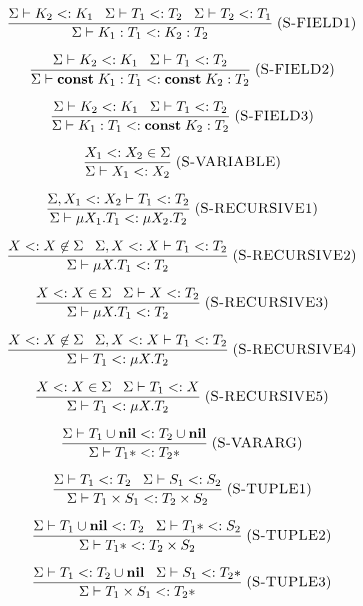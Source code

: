 \[
\frac{\Sigma \vdash K_{2} <: K_{1} \;\;\;
      \Sigma \vdash T_{1} <: T_{2} \;\;\;
      \Sigma \vdash T_{2} <: T_{1}}
     {\Sigma \vdash K_{1}:T_{1} <: K_{2}:T_{2}}
\; (\textsc{S-FIELD1})
\]

\[
\frac{\Sigma \vdash K_{2} <: K_{1} \;\;\;
      \Sigma \vdash T_{1} <: T_{2}}
     {\Sigma \vdash \mathbf{const} \; K_{1}:T_{1} <: \mathbf{const} \; K_{2}:T_{2}}
\; (\textsc{S-FIELD2})
\]

\[
\frac{\Sigma \vdash K_{2} <: K_{1} \;\;\;
      \Sigma \vdash T_{1} <: T_{2}}
     {\Sigma \vdash K_{1}:T_{1} <: \mathbf{const} \; K_{2}:T_{2}}
\; (\textsc{S-FIELD3})
\]

\[
\frac{X_{1} <: X_{2} \in \Sigma}
     {\Sigma \vdash X_{1} <: X_{2}}
\; (\textsc{S-VARIABLE})
\]

\[
\frac{\Sigma, X_{1} <: X_{2} \vdash T_{1} <: T_{2}}
     {\Sigma \vdash \mu X_{1}.T_{1} <: \mu X_{2}.T_{2}}
\; (\textsc{S-RECURSIVE1})
\]

\[
\frac{X <: X \not\in \Sigma \;\;\;
      \Sigma, X <: X \vdash T_{1} <: T_{2}}
     {\Sigma \vdash \mu X.T_{1} <: T_{2}}
\; (\textsc{S-RECURSIVE2})
\]

\[
\frac{X <: X \in \Sigma \;\;\;
      \Sigma \vdash X <: T_{2}}
     {\Sigma \vdash \mu X.T_{1} <: T_{2}}
\; (\textsc{S-RECURSIVE3})
\]

\[
\frac{X <: X \not\in \Sigma \;\;\;
      \Sigma, X <: X \vdash T_{1} <: T_{2}}
     {\Sigma \vdash T_{1} <: \mu X.T_{2}}
\; (\textsc{S-RECURSIVE4})
\]

\[
\frac{X <: X \in \Sigma \;\;\;
      \Sigma \vdash T_{1} <: X}
     {\Sigma \vdash T_{1} <: \mu X.T_{2}}
\; (\textsc{S-RECURSIVE5})
\]

\[
\frac{\Sigma \vdash T_{1} \cup \mathbf{nil} <: T_{2} \cup \mathbf{nil}}
     {\Sigma \vdash T_{1}* <: T_{2}*}
\; (\textsc{S-VARARG})
\]

\[
\frac{\Sigma \vdash T_{1} <: T_{2} \;\;\;
      \Sigma \vdash S_{1} <: S_{2}}
     {\Sigma \vdash T_{1} \times S_{1} <: T_{2} \times S_{2}}
\; (\textsc{S-TUPLE1})
\]

\[
\frac{\Sigma \vdash T_{1} \cup \mathbf{nil} <: T_{2} \;\;\;
      \Sigma \vdash T_{1}* <: S_{2}}
     {\Sigma \vdash T_{1}* <: T_{2} \times S_{2}}
\; (\textsc{S-TUPLE2})
\]

\[
\frac{\Sigma \vdash T_{1} <: T_{2} \cup \mathbf{nil} \;\;\;
      \Sigma \vdash S_{1} <: T_{2}*}
     {\Sigma \vdash T_{1} \times S_{1} <: T_{2}*}
\; (\textsc{S-TUPLE3})
\]

